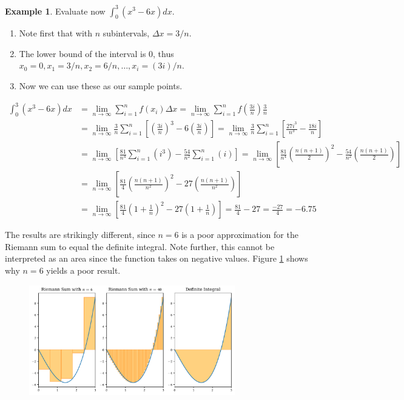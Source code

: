 \documentclass[a4paper,11pt]{article}
\theoremstyle{definition}
\newtheorem{example}{Example}
\theoremstyle{plain}
\begin{document}
\begin{example}
Evaluate now \(\displaystyle\int^3_0 (x^3-6x) dx\).

\begin{enumerate}
\item Note first that with \(n\) subintervals, \(\Delta x = 3/n\).
\item The lower bound of the interval is \(0\), thus \(x_0 = 0, x_1 = 3/n, x_2 = 6/n,\ldots, x_i = (3i)/n\).
\item Now we can use these as our sample points.
\end{enumerate}

\begin{align*}
\int^3_0 (x^3-6x) dx &= \lim_{n\rightarrow\infty} \sum^n_{i=1} f(x_i) \Delta x = \lim_{n\rightarrow\infty} \sum^n_{i=1} f\left(\frac{3i}{n}\right) \frac{3}{n} \\
&= \lim_{n\rightarrow\infty} \frac{3}{n} \sum^n_{i=1} \left[\left(\frac{3i}{n}\right)^3 - 6\left(\frac{3i}{n}\right)\right] = \lim_{n\rightarrow\infty} \frac{3}{n} \sum^n_{i=1} \left[ \frac{27i^3}{n^3} - \frac{18 i}{n} \right] \\
&= \lim_{n\rightarrow\infty} \left[\frac{81}{n^4} \sum^n_{i=1} \left(i^3\right) - \frac{54}{n^2} \sum^n_{i=1} \left(i\right)\right] = \lim_{n\rightarrow\infty} \left[\frac{81}{n^4} \left(\frac{n(n+1)}{2}\right)^2 - \frac{54}{n^2} \left(\frac{n(n+1)}{2}\right)\right] \\
&= \lim_{n\rightarrow\infty} \left[\frac{81}{4} \left(\frac{n(n+1)}{n^2}\right)^2 - 27\left(\frac{n(n+1)}{n^2}\right)\right] \\
&= \lim_{n\rightarrow\infty} \left[\frac{81}{4} \left(1+\frac{1}{n}\right)^2 - 27\left(1+\frac{1}{n}\right)\right] = \frac{81}{4} - 27 = \frac{-27}{4} = -6.75
\end{align*}

The results are strikingly different, since \(n = 6\) is a poor approximation for the Riemann sum to equal the definite integral. Note further, this cannot be interpreted as an area since the function takes on negative values. Figure \ref{fig:riemann_vs_actual} shows why \(n=6\) yields a poor result.
\end{example}

 \begin{figure}[htbp]
 	\centering 
 		\includegraphics[width = 0.8\textwidth]{Ch3_files/Ch3_7_0.pdf}
 		\caption{}
 		\label{fig:riemann_vs_actual}
 \end{figure}
    
\end{document}

